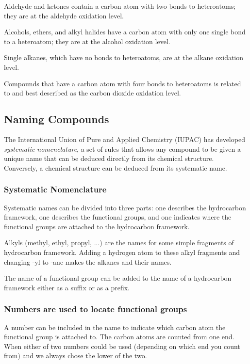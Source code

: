 Aldehyde and ketones contain a carbon atom with two bonds to heteroatoms; they are at the aldehyde oxidation level.

Alcohols, ethers, and alkyl halides have a carbon atom with only one single bond to a heteroatom; they are at the alcohol oxidation level.

Single alkanes, which have no bonds to heteroatoms, are at the alkane oxidation level.

Compounds that have a carbon atom with four bonds to heteroatoms is related to  and best described as the carbon dioxide oxidation level.


\subsection{Naming Compounds}

The International Union of Pure and Applied Chemistry (IUPAC) has developed \emph{systematic nomenclature}, a set of rules that allows any compound to be given a unique name that can be deduced directly from its chemical structure. Conversely, a chemical structure can be deduced from its systematic name.

\subsubsection*{Systematic Nomenclature}

Systematic names can be divided into three parts: one describes the hydrocarbon framework, one describes the functional groups, and one indicates where the functional groups are attached to the hydrocarbon framework.

Alkyls (methyl, ethyl, propyl, ...) are the names for some simple fragments of hydrocarbon framework. Adding a hydrogen atom to these alkyl fragments and changing -yl to -ane makes the alkanes and their names.

The name of a functional group can be added to the name of a hydrocarbon framework either as a suffix or as a prefix.

\subsubsection*{Numbers are used to locate functional groups}

A number can be included in the name to indicate which carbon atom the functional group is attached to. The carbon atoms are counted from one end. When either of two numbers could be used (depending on which end you count from) and we always chose the lower of the two.

